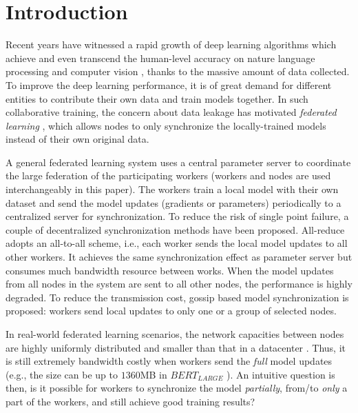 \section{Introduction}


Recent years have witnessed a rapid growth of deep learning algorithms which achieve and even transcend the human-level accuracy on nature language processing and computer vision \cite{devlin2018bert:,he2016deep}, thanks to the massive amount of data collected. To improve the deep learning performance, it is of great demand for different entities to contribute their own data and train models together. In such collaborative training, the concern about data leakage has motivated \emph{federated learning} \cite{McMahan2017FL}, which allows nodes to only synchronize the locally-trained models instead of their own original data. 

A general federated learning system uses a central parameter server to coordinate the large federation of the participating workers (workers and nodes are used interchangeably in this paper). The workers train a local model with their own dataset and send the model updates (\eg gradients or parameters) periodically to a centralized server for synchronization. To reduce the risk of single point failure, a couple of decentralized synchronization methods have been proposed. All-reduce \cite{patarasuk2009allreduce} adopts an all-to-all scheme, i.e., each worker sends the local model updates to all other workers. It achieves the same synchronization effect as parameter server but consumes much bandwidth resource between works. When the model updates from all nodes in the system are sent to all other nodes, the performance is highly degraded. To reduce the transmission cost, gossip based model synchronization \cite{daily2018gossipgrad:,haas2002gossip-based} is proposed: workers send local updates to only one or a group of selected nodes.

In real-world federated learning scenarios, the network capacities between nodes are highly uniformly distributed and smaller than that in a datacenter \cite{vulimiri2015global}. Thus, it is still extremely bandwidth costly when workers send the \emph{full} model updates (e.g., the size can be up to $1360$MB in $BERT_{LARGE}$ \cite{devlin2018bert:}). An intuitive question is then, is it possible for workers to synchronize the model \emph{partially}, from/to \emph{only} a part of the workers, and still achieve good training results? 

